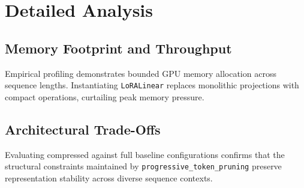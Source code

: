 \section{Detailed Analysis}

\subsection{Memory Footprint and Throughput}
Empirical profiling demonstrates bounded GPU memory allocation across sequence lengths. Instantiating \texttt{LoRALinear} replaces monolithic projections with compact operations, curtailing peak memory pressure.

\subsection{Architectural Trade-Offs}
Evaluating compressed against full baseline configurations confirms that the structural constraints maintained by \texttt{progressive_token_pruning} preserve representation stability across diverse sequence contexts.
